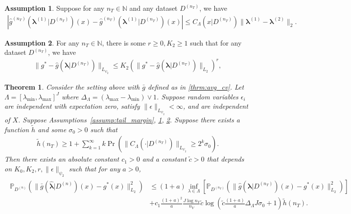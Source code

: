 \documentclass[12pt]{article} %
\newtheorem{theorem}{Theorem}
\theoremstyle{definition}
\newtheorem{assump}{Assumption}
\begin{document}
\begin{assump}
	\label{assump:lipschitz}
	Suppose for any $n_T \in \mathbb{N}$ and any dataset $D^{(n_T)}$, we have
	\begin{align}
	\left |\hat{g}^{(n_T)}(\boldsymbol{\lambda}^{(1)}|D^{(n_T)})(x) - \hat{g}^{(n_T)}(\boldsymbol{\lambda}^{(1)}|D^{(n_T)})(x) \right | \le C_\Lambda(x|D^{(n_T)}) \|\boldsymbol{\lambda}^{(1)} - \boldsymbol{\lambda}^{(2)}\|_2.
	\end{align}
\end{assump}

\begin{assump}
	\label{assump:l2_psi2}
	For any $n_T \in \mathbb{N}$,
	there is some $r \ge 0, K_2 \ge 1$ such that for any dataset $D^{(n_T)}$, we have
	\begin{align}
	\|g^{*}-\hat{g}(\boldsymbol{\lambda}|D^{(n_{T})})\|_{L_{\psi_{2}}}
	\le K_2 \left(\|g^{*}-\hat{g}(\boldsymbol{\lambda}|D^{(n_{T})})\|_{L_{2}}\right)^{r},
	\end{align}
\end{assump}

\begin{theorem}
	\label{thrm:kfold}
	Consider the setting above with $\bar{g}$ defined as in \eqref{thrm:avg_cv}.
	Let $\Lambda=[\lambda_{\min},\lambda_{\max}]^{J}$ where $\Delta_{\Lambda} = (\lambda_{\max} - \lambda_{\min}) \vee 1$.
	Suppose random variables $\epsilon_i$ are independent with expectation zero, satisfy $\|\epsilon\|_{L_{\psi_2}} <\infty$, and are independent of $X$.
	Suppose Assumptions~\ref{assump:tail_margin}, \ref{assump:lipschitz}, \ref{assump:l2_psi2}.
	Suppose there exists a function $\tilde{h}$ and some $\sigma_0 > 0$ such that
	\begin{align}
	\tilde{h}(n_{T})
	\ge
	1 + \sum_{k=1}^{\infty}
	k\Pr\left(\|C_\Lambda(\cdot |D^{(n_{T})})\|_{L_{\psi_{2}}}\ge2^{k}\sigma_{0}\right).
	\end{align}
	Then there exists an absolute constant $c_{1}>0$
	and a constant $\tilde{c}>0$ that depends on $K_0,K_{2},r,\|\epsilon\|_{\psi_{2}}$
	such that for any $a > 0$,
	\begin{align}
	\begin{split}
	\mathbb{P}_{D^{(n)}}\left(
	\|
	\bar{g}(\hat{\boldsymbol{\lambda}}|D^{(n)})(x)
	-g^{*}(x)
	\|_{L_{2}}^{2}\right)
	& \le	(1+a)
	\inf_{\lambda\in\Lambda}
	\left[\mathbb{P}_{D^{(n_{T})}}\left(\|\hat{g}(\boldsymbol{\lambda}|D^{(n_{T})})(x)-g^{*}(x)\|_{L_{2}}^{2}\right)\right] \\
	& + c_{1} \frac{\left(1+a\right)^{2}}{a}
	\frac{J\log n_{V}}{n_{V}}
	\tilde{c}\log\left(\tilde{c}\frac{\left(1+a\right)}{a}\Delta_{\Lambda}J\sigma_{0}+1\right)
	\tilde{h}(n_{T}).
	\end{split}
	\label{eq:cv_lipschitz_oracle_ineq}
	\end{align}
\end{theorem}
\end{document}
